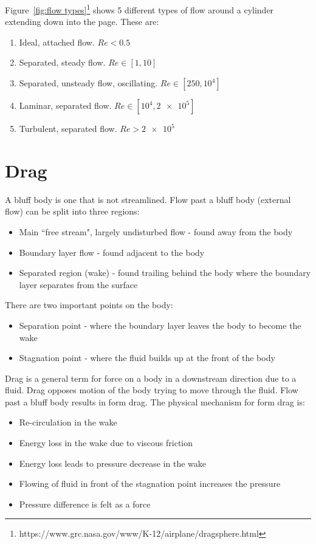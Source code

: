 \documentclass{article}
\begin{document}
    Figure~\ref{fig:flow types}\footnote{https://www.grc.nasa.gov/www/K-12/airplane/dragsphere.html} shows 5 different types of flow around a cylinder extending down into the page. These are:
    \begin{enumerate}
        \item Ideal, attached flow. \(Re<0.5\)
        \item Separated, steady flow. \(Re\in[1,10]\)
        \item Separated, unsteady flow, oscillating. \(Re\in[250,10^4]\)
        \item Laminar, separated flow. \(Re\in[10^4, \num{2e5}]\)
        \item Turbulent, separated flow. \(Re>\num{2e5}\)
    \end{enumerate}
    
    \section{Drag}
    A bluff body is one that is not streamlined. Flow past a bluff body (external flow) can be split into three regions:
    
    \begin{itemize}
        \item Main ``free stream", largely undisturbed flow - found away from the body
        \item Boundary layer flow - found adjacent to the body
        \item Separated region (wake) - found trailing behind the body where the boundary layer separates from the surface
    \end{itemize}

    There are two important points on the body:
    
    \begin{itemize}
        \item Separation point - where the boundary layer leaves the body to become the wake
        \item Stagnation point - where the fluid builds up at the front of the body
    \end{itemize}

    Drag is a general term for force on a body in a downstream direction due to a fluid. 
    Drag opposes motion of the body trying to move through the fluid. Flow past a bluff body results in form drag. 
    The physical mechanism for form drag is:
    
    \begin{itemize}
        \item Re-circulation in the wake
        \item Energy loss in the wake due to viscous friction
        \item Energy loss leads to pressure decrease in the wake
        \item Flowing of fluid in front of the stagnation point increases the pressure
        \item Pressure difference is felt as a force
    \end{itemize}
\end{document}
